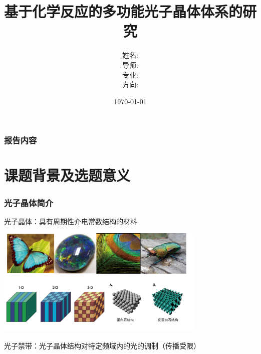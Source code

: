 \documentclass{beamer}
\begin{document}
\title{基于化学反应的多功能光子晶体体系的研究}
\author[田天]{姓名: \\
  导师: \\
  专业: \\
  方向: \\
  }
\date{\today}


\begin{frame}
	\titlepage
\end{frame}


\begin{frame}
	\frametitle{报告内容}
	\tableofcontents
\end{frame}




\section{课题背景及选题意义}
\begin{frame}
  \frametitle{光子晶体简介}
  光子晶体：具有周期性介电常数结构的材料
  \begin{center}
    \includegraphics[width=10cm]{figures/PhC.png}
  \end{center}
  光子禁带：光子晶体结构对特定频域内的光的调制（传播受限）
\end{frame}
\end{document}
